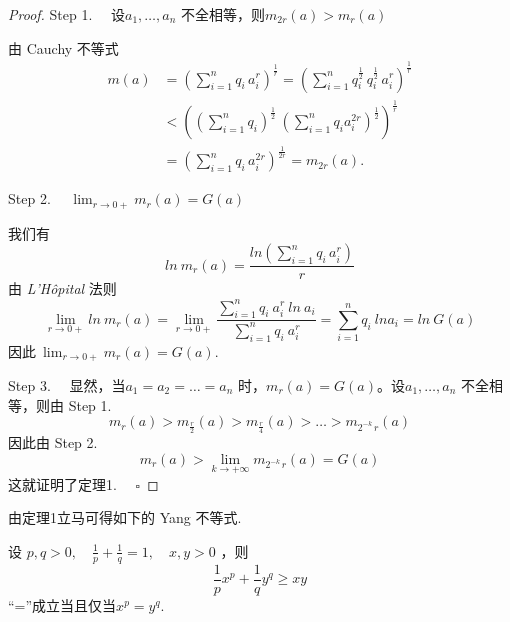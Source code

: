 \documentclass{article}
\begin{document}
\newpage

\begin{proof}
    Step 1. \ \ 设\(a_1,\dots ,a_n\) 不全相等，则\(m_{2r}(a) > m_r(a)\)

\vspace{10pt}

由 Cauchy 不等式
\begin{align*}
    m(a) &= \left(\sum_{i=1}^n q_i\,a_i^r\right)^\frac{1}{r} =\left(\sum_{i=1}^n q_i^{\frac{1}{2}}\,q_i^{\frac{1}{2}}\,a_i^r\right)^\frac{1}{r} \\
    &< \left( (\sum_{i=1}^n q_i)^\frac{1}{2}\ (\sum_{i=1}^n q_i a_i^{2r})^\frac{1}{2}  \right)^\frac{1}{r} \\
    &= \left(\sum_{i=1}^n q_i\,a_i^{2r}\right)^\frac{1}{2r} = m_{2r}(a).
\end{align*}

Step 2. \(\quad \lim_{r \to 0+} m_r(a) = G(a)\)

\vspace{20pt}

我们有
\begin{equation*}
    ln\ m_r(a) = \frac{ln(\sum_{i=1}^n q_i\,a_i^r)}{r}
\end{equation*}
由 \textit{L'Hôpital} 法则
\begin{equation*}
    \lim_{r \to 0 + }ln\ m_r(a) = \lim_{r \to 0 + }\frac{\sum_{i=1}^n q_i\ a_i^r\ ln\ a_i}{\sum_{i=1}^n q_i\ a_i^r} = \sum_{i=1}^n q_i\ ln a_i = ln\ G(a)
\end{equation*}
因此\(\ \lim_{r \to 0 +} m_r(a) = G(a) \).

\vspace{20pt}

Step 3. \ \ 显然，当\(a_1 = a_2 = \dots = a_n\) 时，\(m_r(a) = G(a)\)。设\(a_1,\dots ,a_n\) 不全相等，则由 Step 1.
\begin{equation*}
    m_r(a) > m_{\frac{r}{2} }(a) > m_{\frac{r}{4} }(a) > \dots > m_{2^ { - k}\,r }(a)
\end{equation*}
因此由 Step 2.
\begin{equation*}
    m_r(a) > \lim_{k \to  + \infty }m_{2^ { - k}\,r }(a) = G(a)
\end{equation*}
这就证明了定理1. \(\quad \square\)
\end{proof}

\newpage

由定理1立马可得如下的 Yang 不等式.

\begin{corollary}{}{}
    设 \(p, q > 0,\quad \frac{1}{p} + \frac{1}{q} = 1,\quad x, y > 0\) ，则
\begin{equation*}
    \frac{1}{p} x^p + \frac{1}{q} y^q \ge xy
\end{equation*}
“=”成立当且仅当\(x^p = y^q\).
\end{corollary}
\end{document}
